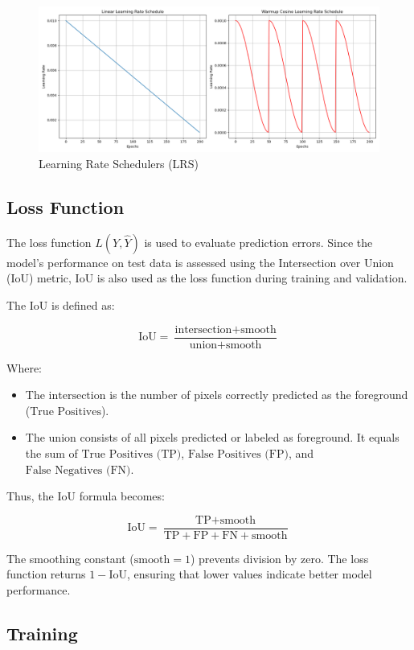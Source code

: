 \begin{figure}[H]
    \centering
    \includegraphics[width=0.9\linewidth]{PICTURES/LRS.png}
    \caption{Learning Rate Schedulers (LRS)}
    \label{fig:LRS}
\end{figure}
\subsection{Loss Function}

The loss function \( L(Y, \hat{Y}) \) is used to evaluate prediction errors. Since the model's performance on test data is assessed using the Intersection over Union (IoU) metric, IoU is also used as the loss function during training and validation.

The IoU is defined as:

\[
\text{IoU} = \frac{\text{intersection} + \text{smooth}}{\text{union} + \text{smooth}}
\]

Where:
\begin{itemize}
    \item The \( \text{intersection} \) is the number of pixels correctly predicted as the foreground (\(\text{True Positives}\)).
    \item The \( \text{union} \) consists of all pixels predicted or labeled as foreground. It equals the sum of \( \text{True Positives (TP)} \), \( \text{False Positives (FP)} \), and \( \text{False Negatives (FN)} \).
\end{itemize}

Thus, the IoU formula becomes:

\[
\text{IoU} = \frac{\text{TP} + \text{smooth}}{\text{TP} + \text{FP} + \text{FN} + \text{smooth}}
\]

The smoothing constant (\(\text{smooth} = 1\)) prevents division by zero. The loss function returns \( 1 - \text{IoU} \), ensuring that lower values indicate better model performance.

\subsection{Training}

